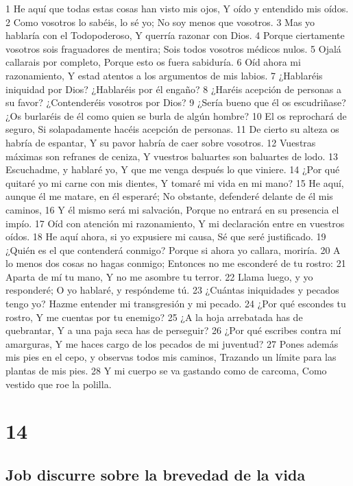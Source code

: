 1 He aquí que todas estas cosas han visto mis ojos,
Y oído y entendido mis oídos.
2 Como vosotros lo sabéis, lo sé yo;
No soy menos que vosotros.
3 Mas yo hablaría con el Todopoderoso,
Y querría razonar con Dios.
4 Porque ciertamente vosotros sois fraguadores de mentira;
Sois todos vosotros médicos nulos.
5 Ojalá callarais por completo,
Porque esto os fuera sabiduría.
6 Oíd ahora mi razonamiento,
Y estad atentos a los argumentos de mis labios. 
7 ¿Hablaréis iniquidad por Dios?
¿Hablaréis por él engaño?
8 ¿Haréis acepción de personas a su favor?
¿Contenderéis vosotros por Dios?
9 ¿Sería bueno que él os escudriñase?
¿Os burlaréis de él como quien se burla de algún hombre?
10 El os reprochará de seguro,
Si solapadamente hacéis acepción de personas.
11 De cierto su alteza os habría de espantar,
Y su pavor habría de caer sobre vosotros.
12 Vuestras máximas son refranes de ceniza,
Y vuestros baluartes son baluartes de lodo.
13 Escuchadme, y hablaré yo,
Y que me venga después lo que viniere.
14 ¿Por qué quitaré yo mi carne con mis dientes,
Y tomaré mi vida en mi mano?
15 He aquí, aunque él me matare, en él esperaré;
No obstante, defenderé delante de él mis caminos,
16 Y él mismo será mi salvación,
Porque no entrará en su presencia el impío.
17 Oíd con atención mi razonamiento,
Y mi declaración entre en vuestros oídos.
18 He aquí ahora, si yo expusiere mi causa,
Sé que seré justificado.
19 ¿Quién es el que contenderá conmigo?
Porque si ahora yo callara, moriría.
20 A lo menos dos cosas no hagas conmigo;
Entonces no me esconderé de tu rostro:
21 Aparta de mí tu mano,
Y no me asombre tu terror.
22 Llama luego, y yo responderé;
O yo hablaré, y respóndeme tú.
23 ¿Cuántas iniquidades y pecados tengo yo?
Hazme entender mi transgresión y mi pecado.
24 ¿Por qué escondes tu rostro,
Y me cuentas por tu enemigo?
25 ¿A la hoja arrebatada has de quebrantar,
Y a una paja seca has de perseguir?
26 ¿Por qué escribes contra mí amarguras,
Y me haces cargo de los pecados de mi juventud?
27 Pones además mis pies en el cepo, y observas todos mis caminos,
Trazando un límite para las plantas de mis pies. 
28 Y mi cuerpo se va gastando como de carcoma,
Como vestido que roe la polilla. 

\chapter{14}

\section*{Job discurre sobre la brevedad de la vida}

